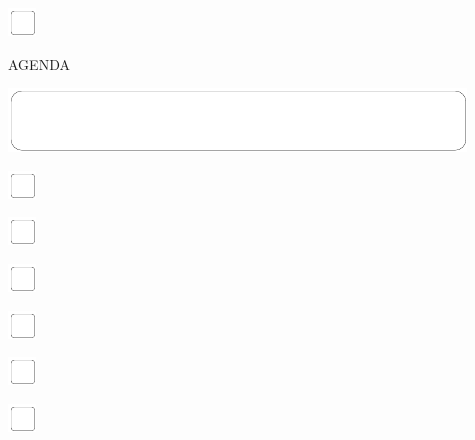 \documentclass[11pt,titlepage]{article}
\begin{document}
\vspace{10mm}

\noindent
\includegraphics[]{checkbox-4mm.pdf}

\pagebreak

\small
\hfill AGENDA

\vspace{6mm}

\noindent
\includegraphics[]{mediumbox.pdf}

\vspace{15mm}

\noindent
\includegraphics[]{checkbox-4mm.pdf}

\vspace{10mm}

\noindent
\includegraphics[]{checkbox-4mm.pdf}

\vspace{10mm}

\noindent
\includegraphics[]{checkbox-4mm.pdf}

\vspace{10mm}

\noindent
\includegraphics[]{checkbox-4mm.pdf}

\vspace{10mm}

\noindent
\includegraphics[]{checkbox-4mm.pdf}

\vspace{10mm}

\noindent
\includegraphics[]{checkbox-4mm.pdf}
\end{document}
